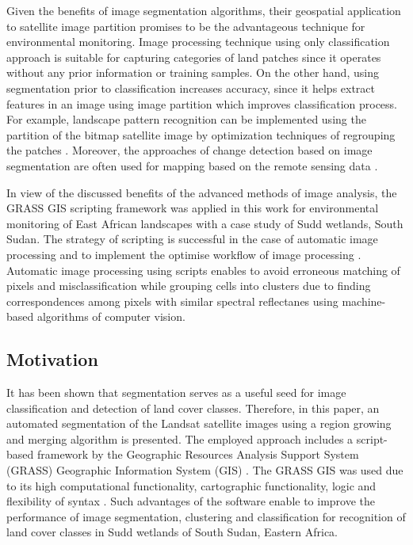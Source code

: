 \documentclass[analytics,article,submit,pdftex,moreauthors]{Definitions/mdpi}
\begin{document}
Given the benefits of image segmentation algorithms, their geospatial application to satellite image partition promises to be the advantageous technique for environmental monitoring. Image processing technique using only classification approach is suitable for capturing categories of land patches since it operates without any prior information or training samples. On the other hand, using segmentation prior to classification increases accuracy, since it helps extract features in an image using image partition which improves classification process. For example, landscape pattern recognition can be implemented using the partition of the bitmap satellite image by optimization techniques of regrouping the patches \cite{Lietal2017}. Moreover, the approaches of change detection based on image segmentation are often used for mapping based on the remote sensing data \cite{LeiNandi}. 

In view of the discussed benefits of the advanced methods of image analysis, the GRASS GIS scripting framework was applied in this work for environmental monitoring of East African landscapes with a case study of Sudd wetlands, South Sudan. The strategy of scripting is successful in the case of automatic image processing and to implement the optimise workflow of image processing \cite{Borcard,ijgi11090473}. Automatic image processing using scripts enables to avoid erroneous matching of pixels and misclassification while grouping cells into clusters due to finding correspondences among pixels with similar spectral reflectanes using machine-based algorithms of computer vision.

\subsection{Motivation} 

It has been shown that segmentation serves as a useful seed for image classification and detection of land cover classes. Therefore, in this paper, an automated segmentation of the Landsat satellite images using a region growing and merging algorithm is presented. The employed approach includes a script-based framework by the Geographic Resources Analysis Support System (GRASS) Geographic Information System (GIS) \cite{Neteleretal2008}. The GRASS GIS was used due to its high computational functionality, cartographic functionality, logic and flexibility of syntax \cite{NetelerMitasova2008}. Such advantages of the software enable to improve the performance of image segmentation, clustering and classification for recognition of land cover classes in Sudd wetlands of South Sudan, Eastern Africa. 
\end{document}
